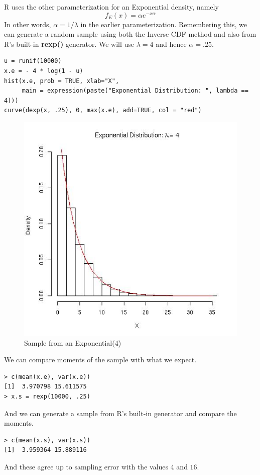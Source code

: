 \documentclass{article}
\def\SFunction#1{\textbf{#1()}}
\begin{document}
R uses the other parameterization for an Exponential density,
namely
$$ f_E(x) = \alpha e^{- x \alpha}$$ In other words, $\alpha =
1/\lambda$ in the earlier parameterization.  Remembering this, we can
generate a random sample using both the Inverse CDF method and also
from R's built-in \SFunction{rexp} generator.
We will use $\lambda = 4$ and hence $\alpha = .25$.
\begin{verbatim}
u = runif(10000)
x.e = - 4 * log(1 - u)
hist(x.e, prob = TRUE, xlab="X", 
     main = expression(paste("Exponential Distribution: ", lambda == 4)))
curve(dexp(x, .25), 0, max(x.e), add=TRUE, col = "red")
\end{verbatim}

\begin{figure}[htbp]
  \begin{center}
    \leavevmode
     \includegraphics{expInv.jpg}    
    \caption{Sample from an Exponential(4)}
    \label{fig:expInv}
  \end{center}
\end{figure}


We can compare moments of the sample with what we expect.
\begin{verbatim}
> c(mean(x.e), var(x.e))
[1]  3.970798 15.611575
> x.s = rexp(10000, .25)
\end{verbatim}
And we can generate a sample from 
R's built-in generator and compare
the moments.
\begin{verbatim}
> c(mean(x.s), var(x.s))
[1]  3.959364 15.889116
\end{verbatim}
And these agree up to sampling error
with the values $4$ and $16$.
\end{document}
